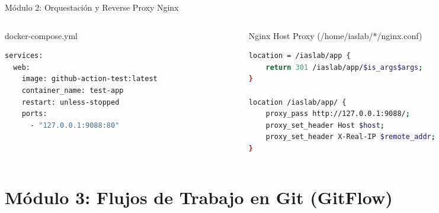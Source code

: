 \documentclass[aspectratio=169,10pt]{beamer}
\begin{document}
\begin{frame}[fragile]{Módulo 2: Orquestación y Reverse Proxy Nginx}
  \begin{columns}
    \begin{column}{0.5\textwidth}
      \begin{block}{docker-compose.yml}
        \begin{lstlisting}[language=bash]
services:
  web:
    image: github-action-test:latest
    container_name: test-app
    restart: unless-stopped
    ports:
      - "127.0.0.1:9088:80"
        \end{lstlisting}
      \end{block}
    \end{column}
    \begin{column}{0.5\textwidth}
      \begin{block}{Nginx Host Proxy (/home/iaslab/*/nginx.conf)}
        \begin{lstlisting}[language=bash]
location = /iaslab/app {
    return 301 /iaslab/app/$is_args$args;
}

location /iaslab/app/ {
    proxy_pass http://127.0.0.1:9088/;
    proxy_set_header Host $host;
    proxy_set_header X-Real-IP $remote_addr;
}
        \end{lstlisting}
      \end{block}
    \end{column}
  \end{columns}
\end{frame}

\section{Módulo 3: Flujos de Trabajo en Git (GitFlow)}
\end{document}
